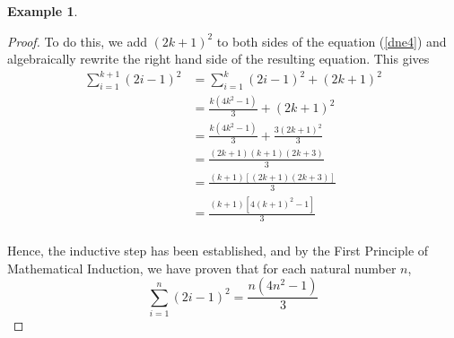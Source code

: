 \documentclass{book}
\theoremstyle{definition}
\newtheorem{example}{Example}[definition]
\theoremstyle{remark}
\begin{document}
\begin{example}
\begin{proof}
        To do this, we add $(2k+1)^2$ to both sides of the equation (\ref{dne4}) and algebraically rewrite the right hand side of the resulting equation. This gives
            \begin{align*}
                \sum_{i=1}^{k+1}{(2i-1)^2} & = \sum_{i=1}^{k}{(2i-1)^2} + (2k+1)^2 \\
                    & = \frac{k(4k^2 - 1)}{3} + (2k + 1)^2 \\
                    & = \frac{k(4k^2 - 1)}{3} + \frac{3(2k + 1)^2}{3} \\
                    & = \frac{(2k+1)(k+1)(2k+3)}{3} \\
                    & = \frac{(k+1)[(2k+1)(2k+3)]}{3} \\
                    & = \frac{(k+1)[4(k+1)^2 - 1]}{3} \\
            \end{align*}
        
        Hence, the inductive step has been established, and by the First Principle of Mathematical Induction, we have proven that for each natural number $n$,
            \begin{equation*}
                \sum_{i=1}^{n}{(2i-1)^2} = \frac{n(4n^2 - 1)}{3}
            \end{equation*}
    \end{proof}
\end{example}
\end{document}
